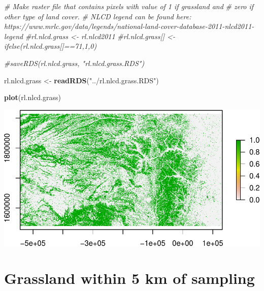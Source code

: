 \documentclass[
]{book}
\newenvironment{Shaded}{\begin{snugshade}}{\end{snugshade}}
\newcommand{\AttributeTok}[1]{\textcolor[rgb]{0.13,0.29,0.53}{#1}}
\newcommand{\CommentTok}[1]{\textcolor[rgb]{0.56,0.35,0.01}{\textit{#1}}}
\newcommand{\DecValTok}[1]{\textcolor[rgb]{0.00,0.00,0.81}{#1}}
\newcommand{\FunctionTok}[1]{\textcolor[rgb]{0.13,0.29,0.53}{\textbf{#1}}}
\newcommand{\NormalTok}[1]{#1}
\newcommand{\OtherTok}[1]{\textcolor[rgb]{0.56,0.35,0.01}{#1}}
\newcommand{\SpecialCharTok}[1]{\textcolor[rgb]{0.81,0.36,0.00}{\textbf{#1}}}
\newcommand{\StringTok}[1]{\textcolor[rgb]{0.31,0.60,0.02}{#1}}
\begin{document}
\begin{Shaded}
\begin{Highlighting}[]
\CommentTok{\# Make raster file that contains pixels with value of 1 if grassland and }
\CommentTok{\# zero if other type of land cover.}
\CommentTok{\# NLCD legend can be found here: https://www.mrlc.gov/data/legends/national{-}land{-}cover{-}database{-}2011{-}nlcd2011{-}legend}
\CommentTok{\#rl.nlcd.grass \textless{}{-} rl.nlcd2011}
\CommentTok{\#rl.nlcd.grass[] \textless{}{-} ifelse(rl.nlcd.grass[]==71,1,0)}

\CommentTok{\#saveRDS(rl.nlcd.grass, "rl.nlcd.grass.RDS")}

\NormalTok{rl.nlcd.grass }\OtherTok{\textless{}{-}} \FunctionTok{readRDS}\NormalTok{(}\StringTok{"../rl.nlcd.grass.RDS"}\NormalTok{)}

\FunctionTok{plot}\NormalTok{(rl.nlcd.grass)}
\end{Highlighting}
\end{Shaded}

\includegraphics{_main_files/figure-latex/unnamed-chunk-29-1.pdf}

\hypertarget{grassland-within-5-km-of-sampling}{%
\chapter{Grassland within 5 km of sampling}\label{grassland-within-5-km-of-sampling}}

\begin{Shaded}
\end{Shaded}
\end{document}
